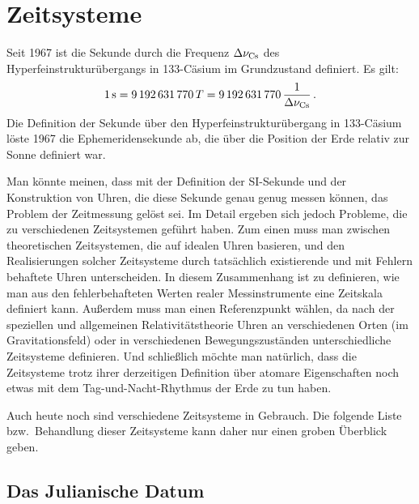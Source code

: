 

\chapter{Zeitsysteme}
\label{chap_Zeitsysteme}


Seit 1967 ist die Sekunde 
durch die Frequenz $\Delta \nu_{\rm Cs}$ des Hyperfeinstruktur\"ubergangs
in 133-C\"asium im Grundzustand definiert. Es gilt:
\begin{equation}
               1\,{\rm s}  =  9\,192\,631\,770 \, T = 9\,192\,631\,770 \, \frac{1}{\Delta \nu_{\rm Cs}} \, .
\end{equation}  
Die Definition der Sekunde \"uber den Hyperfeinstruktur\"ubergang in 133-C\"asium l\"oste 1967 die 
Ephemeridensekunde ab, die \"uber die Position der Erde relativ zur Sonne definiert war. 

Man k\"onnte meinen, dass mit der Definition der SI-Sekunde und der Konstruktion von
Uhren, die diese Sekunde genau genug messen k\"onnen, das Problem der Zeitmessung
gel\"ost sei. Im Detail ergeben sich jedoch Probleme, die zu verschiedenen
Zeitsystemen gef\"uhrt haben. Zum einen muss man zwischen theoretischen Zeitsystemen,
die auf idealen Uhren basieren, und den Realisierungen solcher Zeitsysteme durch
tats\"achlich existierende und mit Fehlern behaftete Uhren unterscheiden. In diesem Zusammenhang
ist zu definieren, wie man aus den fehlerbehafteten Werten realer Messinstrumente eine Zeitskala
definiert kann. Au\ss erdem muss
man einen Referenzpunkt w\"ahlen, da nach der speziellen und allgemeinen Relativit\"atstheorie
Uhren an verschiedenen Orten (im Gravitationsfeld) oder in verschiedenen Bewegungszust\"anden
unterschiedliche Zeitsysteme definieren. Und schlie\ss lich m\"ochte man nat\"urlich, dass die
Zeitsysteme trotz ihrer derzeitigen Definition \"uber atomare Eigenschaften noch etwas mit dem 
Tag-und-Nacht-Rhythmus der Erde zu tun haben.

Auch heute noch sind verschiedene Zeitsysteme in Gebrauch. Die folgende Liste bzw.\ Behandlung
dieser Zeitsysteme kann daher nur einen groben \"Uberblick geben. 

\section{Das Julianische Datum}

